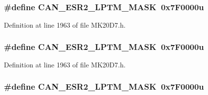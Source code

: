 \subsubsection[{\texorpdfstring{C\+A\+N\+\_\+\+E\+S\+R2\+\_\+\+L\+P\+T\+M\+\_\+\+M\+A\+SK}{CAN_ESR2_LPTM_MASK}}]{\setlength{\rightskip}{0pt plus 5cm}\#define C\+A\+N\+\_\+\+E\+S\+R2\+\_\+\+L\+P\+T\+M\+\_\+\+M\+A\+SK~0x7\+F0000u}\hypertarget{group___c_a_n___register___masks_ga864e9e1cd2a2b0e354b284bd5488f29e}{}\label{group___c_a_n___register___masks_ga864e9e1cd2a2b0e354b284bd5488f29e}


Definition at line 1963 of file M\+K20\+D7.\+h.

\subsubsection[{\texorpdfstring{C\+A\+N\+\_\+\+E\+S\+R2\+\_\+\+L\+P\+T\+M\+\_\+\+M\+A\+SK}{CAN_ESR2_LPTM_MASK}}]{\setlength{\rightskip}{0pt plus 5cm}\#define C\+A\+N\+\_\+\+E\+S\+R2\+\_\+\+L\+P\+T\+M\+\_\+\+M\+A\+SK~0x7\+F0000u}\hypertarget{group___c_a_n___register___masks_ga864e9e1cd2a2b0e354b284bd5488f29e}{}\label{group___c_a_n___register___masks_ga864e9e1cd2a2b0e354b284bd5488f29e}


Definition at line 1963 of file M\+K20\+D7.\+h.

\subsubsection[{\texorpdfstring{C\+A\+N\+\_\+\+E\+S\+R2\+\_\+\+L\+P\+T\+M\+\_\+\+M\+A\+SK}{CAN_ESR2_LPTM_MASK}}]{\setlength{\rightskip}{0pt plus 5cm}\#define C\+A\+N\+\_\+\+E\+S\+R2\+\_\+\+L\+P\+T\+M\+\_\+\+M\+A\+SK~0x7\+F0000u}\hypertarget{group___c_a_n___register___masks_ga864e9e1cd2a2b0e354b284bd5488f29e}{}\label{group___c_a_n___register___masks_ga864e9e1cd2a2b0e354b284bd5488f29e}


